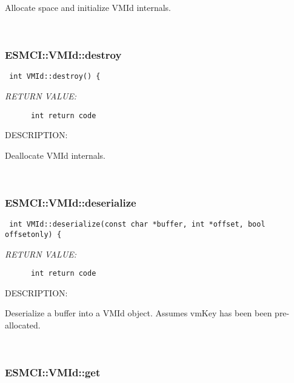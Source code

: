       Allocate space and initialize VMId internals.
   
 
\mbox{}\hrulefill\
 
\subsubsection [ESMCI::VMId::destroy] {ESMCI::VMId::destroy}


  
\begin{verbatim} int VMId::destroy() {\end{verbatim}{\em RETURN VALUE:}
\begin{verbatim}      int return code\end{verbatim}
{\sf DESCRIPTION:\\ }


      Deallocate VMId internals.
   
 
\mbox{}\hrulefill\
 
\subsubsection [ESMCI::VMId::deserialize] {ESMCI::VMId::deserialize}


  
\begin{verbatim} int VMId::deserialize(const char *buffer, int *offset, bool offsetonly) {\end{verbatim}{\em RETURN VALUE:}
\begin{verbatim}      int return code\end{verbatim}
{\sf DESCRIPTION:\\ }


      Deserialize a buffer into a VMId object.  Assumes vmKey has been
      been pre-allocated.
   
 
\mbox{}\hrulefill\
 
\subsubsection [ESMCI::VMId::get] {ESMCI::VMId::get}


